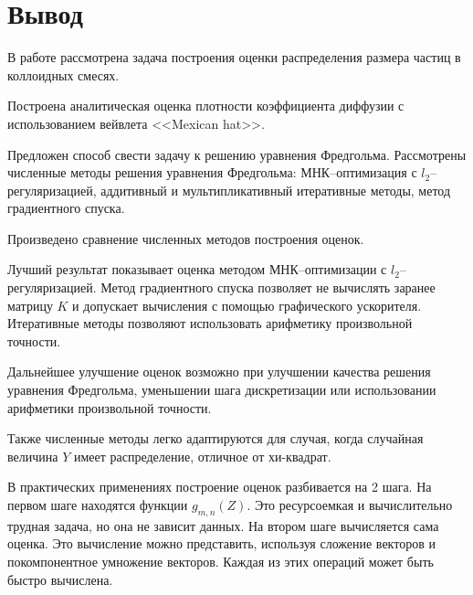 \documentclass[../paper.tex]{subfiles}
\begin{document}
\section{Вывод}
В работе рассмотрена задача построения оценки распределения размера частиц в коллоидных смесях.

Построена аналитическая оценка плотности коэффициента диффузии с использованием вейвлета <<Mexican hat>>.

Предложен способ свести задачу к решению уравнения Фредгольма.
Рассмотрены численные методы решения уравнения Фредгольма: МНК--опти\-ми\-зация с $l_2$--регуляризацией,
аддитивный и мультипликативный итеративные методы, метод градиентного спуска.

Произведено сравнение численных методов построения оценок.

Лучший результат показывает оценка методом МНК--оптимизации с $l_2$--регу\-ляризацией.
Метод градиентного спуска позволяет не вычислять заранее матрицу $K$ и допускает вычисления с помощью графического ускорителя.
Итеративные методы позволяют использовать арифметику произвольной точности.

Дальнейшее улучшение оценок возможно при улучшении качества решения уравнения Фредгольма, уменьшении шага дискретизации или
использовании арифметики произвольной точности.

Также численные методы легко адаптируются для случая, когда случайная величина $Y$ имеет распределение, отличное от хи-квадрат.

В практических применениях построение оценок разбивается на 2 шага. На первом шаге находятся функции $g_{m,n}(Z)$. Это ресурсоемкая и вычислительно трудная задача,
но она не зависит данных. На втором шаге вычисляется сама оценка. Это вычисление можно представить, используя сложение векторов и покомпонентное умножение векторов.
Каждая из этих операций может быть быстро вычислена.
\end{document}
